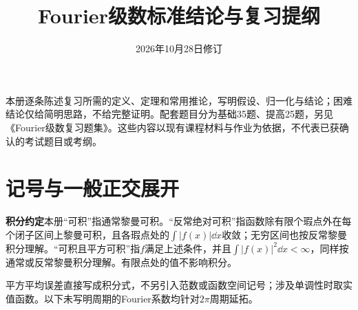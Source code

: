 
\title{Fourier级数标准结论与复习提纲}
\author{}
\date{2026年10月28日修订}

\maketitle
本册逐条陈述复习所需的定义、定理和常用推论，写明假设、归一化与结论；困难结论仅给简明思路，不给完整证明。配套题目分为基础35题、提高25题，另见《Fourier级数复习题集》。这些内容以现有课程材料与作业为依据，不代表已获确认的考试题目或考纲。
\sources
\clearpage
\tableofcontents
\clearpage
\section{记号与一般正交展开}
\noindent\textbf{积分约定}\quad 本册“可积”指通常黎曼可积。“反常绝对可积”指函数除有限个瑕点外在每个闭子区间上黎曼可积，且各瑕点处的$\int|f(x)|\dd x$收敛；无穷区间也按反常黎曼积分理解。“可积且平方可积”指$f$满足上述条件，并且$\int|f(x)|^2\dd x<\infty$，同样按通常或反常黎曼积分理解。有限点处的值不影响积分。

平方平均误差直接写成积分式，不另引入范数或函数空间记号；涉及单调性时取实值函数。以下未写明周期的Fourier系数均针对$2\pi$周期延拓。

